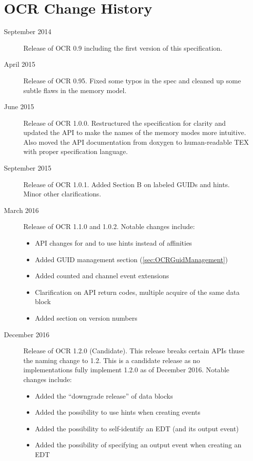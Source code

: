 %

\chapter{OCR Change  History}
\label{chap:OCR Change History}
\label{chap:Appendix D}
\begin{description}
\item[September 2014] Release of OCR 0.9 including the first version
  of this specification.
\item[April 2015] Release of OCR 0.95.  Fixed some typos in the spec and
cleaned up some subtle flaws in the memory model.
\item[June 2015] Release of OCR 1.0.0. Restructured the specification for clarity and
updated the API to make the names of the memory modes more intuitive. Also moved
the API documentation from doxygen to human-readable TEX with proper specification
language.
\item[September 2015] Release of OCR 1.0.1. Added Section B on labeled GUIDs and
hints. Minor other clarifications.
\item[March 2016] Release of OCR 1.1.0 and 1.0.2. Notable changes include:
\begin{itemize}
\item{API changes for  and  to
  use hints instead of affinities}
\item{Added GUID management section (\ref{sec:OCRGuidManagement})}
\item{Added counted and channel event extensions}
\item{Clarification on API return codes, multiple acquire of the same
  data block}
\item{Added section on version numbers}
\end{itemize}
\item[December 2016] Release of OCR 1.2.0 (Candidate). This release breaks certain
APIs thuse the naming change to 1.2. This is a candidate release as no implementations
fully implement 1.2.0 as of December 2016. Notable changes include:
\begin{itemize}
\item{Added the ``downgrade release'' of data blocks}
\item{Added the possibility to use hints when creating events}
\item{Added the possibility to self-identify an EDT (and its output event)}
\item{Added the possibility of specifying an output event when creating an EDT}

\end{itemize}
\end{description}
